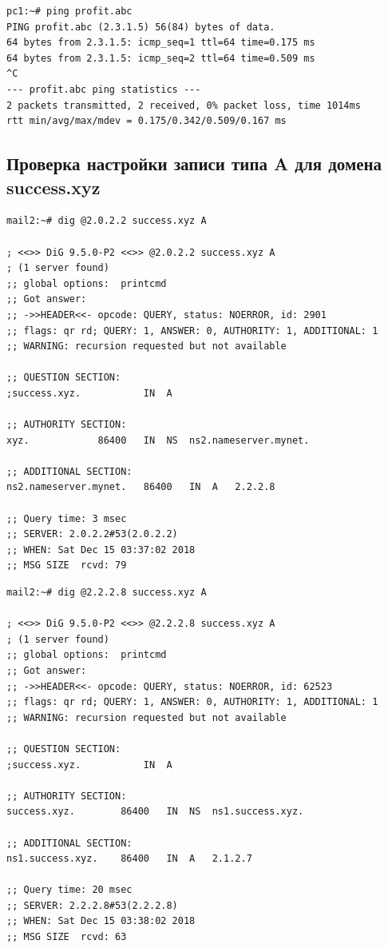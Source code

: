 \documentclass[a4paper,12pt]{article}
\begin{document}
\begin{verbatim}
pc1:~# ping profit.abc
PING profit.abc (2.3.1.5) 56(84) bytes of data.
64 bytes from 2.3.1.5: icmp_seq=1 ttl=64 time=0.175 ms
64 bytes from 2.3.1.5: icmp_seq=2 ttl=64 time=0.509 ms
^C
--- profit.abc ping statistics ---
2 packets transmitted, 2 received, 0% packet loss, time 1014ms
rtt min/avg/max/mdev = 0.175/0.342/0.509/0.167 ms
\end{verbatim}

\subsection{Проверка настройки записи типа A для домена success.xyz}

\begin{verbatim}
mail2:~# dig @2.0.2.2 success.xyz A

; <<>> DiG 9.5.0-P2 <<>> @2.0.2.2 success.xyz A
; (1 server found)
;; global options:  printcmd
;; Got answer:
;; ->>HEADER<<- opcode: QUERY, status: NOERROR, id: 2901
;; flags: qr rd; QUERY: 1, ANSWER: 0, AUTHORITY: 1, ADDITIONAL: 1
;; WARNING: recursion requested but not available

;; QUESTION SECTION:
;success.xyz.			IN	A

;; AUTHORITY SECTION:
xyz.			86400	IN	NS	ns2.nameserver.mynet.

;; ADDITIONAL SECTION:
ns2.nameserver.mynet.	86400	IN	A	2.2.2.8

;; Query time: 3 msec
;; SERVER: 2.0.2.2#53(2.0.2.2)
;; WHEN: Sat Dec 15 03:37:02 2018
;; MSG SIZE  rcvd: 79

\end{verbatim}

\begin{verbatim}
mail2:~# dig @2.2.2.8 success.xyz A

; <<>> DiG 9.5.0-P2 <<>> @2.2.2.8 success.xyz A
; (1 server found)
;; global options:  printcmd
;; Got answer:
;; ->>HEADER<<- opcode: QUERY, status: NOERROR, id: 62523
;; flags: qr rd; QUERY: 1, ANSWER: 0, AUTHORITY: 1, ADDITIONAL: 1
;; WARNING: recursion requested but not available

;; QUESTION SECTION:
;success.xyz.			IN	A

;; AUTHORITY SECTION:
success.xyz.		86400	IN	NS	ns1.success.xyz.

;; ADDITIONAL SECTION:
ns1.success.xyz.	86400	IN	A	2.1.2.7

;; Query time: 20 msec
;; SERVER: 2.2.2.8#53(2.2.2.8)
;; WHEN: Sat Dec 15 03:38:02 2018
;; MSG SIZE  rcvd: 63

\end{verbatim}
\end{document}
